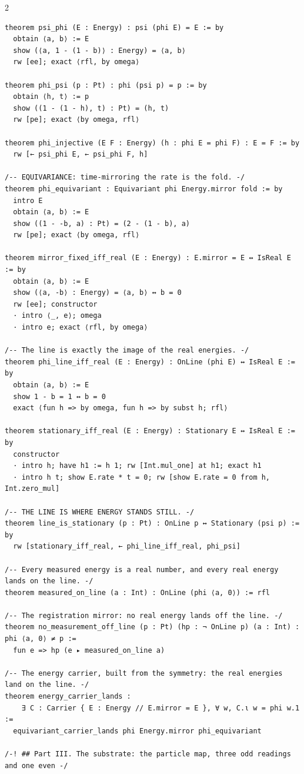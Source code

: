 \documentclass[10pt]{article}
\begin{document}
\begin{multicols}{2}
\begin{Verbatim}[fontsize=\fontsize{5.9}{6.8}\selectfont,breaklines,breakanywhere,breaksymbolleft={}]
theorem psi_phi (E : Energy) : psi (phi E) = E := by
  obtain ⟨a, b⟩ := E
  show (⟨a, 1 - (1 - b)⟩ : Energy) = ⟨a, b⟩
  rw [ee]; exact ⟨rfl, by omega⟩

theorem phi_psi (p : Pt) : phi (psi p) = p := by
  obtain ⟨h, t⟩ := p
  show ((1 - (1 - h), t) : Pt) = (h, t)
  rw [pe]; exact ⟨by omega, rfl⟩

theorem phi_injective (E F : Energy) (h : phi E = phi F) : E = F := by
  rw [← psi_phi E, ← psi_phi F, h]

/-- EQUIVARIANCE: time-mirroring the rate is the fold. -/
theorem phi_equivariant : Equivariant phi Energy.mirror fold := by
  intro E
  obtain ⟨a, b⟩ := E
  show ((1 - -b, a) : Pt) = (2 - (1 - b), a)
  rw [pe]; exact ⟨by omega, rfl⟩

theorem mirror_fixed_iff_real (E : Energy) : E.mirror = E ↔ IsReal E := by
  obtain ⟨a, b⟩ := E
  show (⟨a, -b⟩ : Energy) = ⟨a, b⟩ ↔ b = 0
  rw [ee]; constructor
  · intro ⟨_, e⟩; omega
  · intro e; exact ⟨rfl, by omega⟩

/-- The line is exactly the image of the real energies. -/
theorem phi_line_iff_real (E : Energy) : OnLine (phi E) ↔ IsReal E := by
  obtain ⟨a, b⟩ := E
  show 1 - b = 1 ↔ b = 0
  exact ⟨fun h => by omega, fun h => by subst h; rfl⟩

theorem stationary_iff_real (E : Energy) : Stationary E ↔ IsReal E := by
  constructor
  · intro h; have h1 := h 1; rw [Int.mul_one] at h1; exact h1
  · intro h t; show E.rate * t = 0; rw [show E.rate = 0 from h, Int.zero_mul]

/-- THE LINE IS WHERE ENERGY STANDS STILL. -/
theorem line_is_stationary (p : Pt) : OnLine p ↔ Stationary (psi p) := by
  rw [stationary_iff_real, ← phi_line_iff_real, phi_psi]

/-- Every measured energy is a real number, and every real energy lands on the line. -/
theorem measured_on_line (a : Int) : OnLine (phi ⟨a, 0⟩) := rfl

/-- The registration mirror: no real energy lands off the line. -/
theorem no_measurement_off_line (p : Pt) (hp : ¬ OnLine p) (a : Int) : phi ⟨a, 0⟩ ≠ p :=
  fun e => hp (e ▸ measured_on_line a)

/-- The energy carrier, built from the symmetry: the real energies land on the line. -/
theorem energy_carrier_lands :
    ∃ C : Carrier { E : Energy // E.mirror = E }, ∀ w, C.ι w = phi w.1 :=
  equivariant_carrier_lands phi Energy.mirror phi_equivariant

/-! ## Part III. The substrate: the particle map, three odd readings and one even -/


\end{Verbatim}
\end{multicols}
\end{document}
